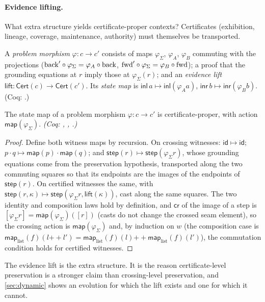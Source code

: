\paragraph{Evidence lifting.}
What extra structure yields certificate-proper contexts? Certificates (exhibition, lineage, coverage, maintenance, authority) must themselves be transported.
\begin{defi}\label{def:pm}
A \emph{problem morphism} $\varphi : c \to c'$ consists of maps $\varphi_\Sigma$, $\varphi_A$, $\varphi_B$ commuting with the projections ($\mathrm{back}' \circ \varphi_\Sigma = \varphi_A \circ \mathrm{back}$, $\mathrm{fwd}' \circ \varphi_\Sigma = \varphi_B \circ \mathrm{fwd}$); a proof that the grounding equations at $r$ imply those at $\varphi_\Sigma(r)$; and an \emph{evidence lift} $\mathsf{lift} : \mathsf{Cert}(c) \to \mathsf{Cert}(c')$. Its \emph{state map} is $\mathsf{inl}\,a \mapsto \mathsf{inl}(\varphi_A a)$, $\mathsf{inr}\,b \mapsto \mathsf{inr}(\varphi_B b)$. (Coq: .)
\end{defi}
\begin{thm}\label{thm:lifting}
The state map of a problem morphism $\varphi : c \to c'$ is certificate-proper, with action $\mathsf{map}(\varphi_\Sigma)$. \emph{(Coq: , , .)}
\end{thm}
\begin{proof}
Define both witness maps by recursion. On crossing witnesses: $\mathsf{id} \mapsto \mathsf{id}$; $p \cdot q \mapsto \mathsf{map}(p) \cdot \mathsf{map}(q)$; and $\mathsf{step}(r) \mapsto \mathsf{step}(\varphi_\Sigma r)$, whose grounding equations come from the preservation hypothesis, transported along the two commuting squares so that its endpoints are the images of the endpoints of $\mathsf{step}(r)$. On certified witnesses the same, with $\mathsf{step}(r,\kappa) \mapsto \mathsf{step}(\varphi_\Sigma r, \mathsf{lift}(\kappa))$, cast along the same squares. The two identity and composition laws hold by definition, and $\mathsf{cr}$ of the image of a step is $[\varphi_\Sigma r] = \mathsf{map}(\varphi_\Sigma)([r])$ (casts do not change the crossed seam element), so the crossing action is $\mathsf{map}(\varphi_\Sigma)$ and, by induction on $w$ (the composition case is $\mathsf{map}_{\mathrm{list}}(f)(l \mathbin{+\!\!+} l') = \mathsf{map}_{\mathrm{list}}(f)(l) \mathbin{+\!\!+} \mathsf{map}_{\mathrm{list}}(f)(l')$), the commutation condition holds for certified witnesses.
\end{proof}
The evidence lift is the extra structure. It is the reason certificate-level preservation is a stronger claim than crossing-level preservation, and \cref{sec:dynamic} shows an evolution for which the lift exists and one for which it cannot.

